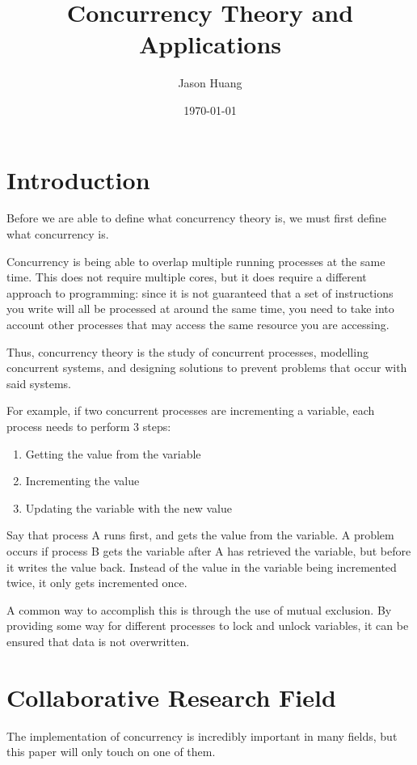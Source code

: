 \documentclass[jou]{apa7}
\title{Concurrency Theory and Applications}
\author{Jason Huang}
\date{\today}
\begin{document}
\maketitle

\section{Introduction}
Before we are able to define what concurrency theory is,
we must first define what concurrency is.

Concurrency is being able to overlap multiple running processes at the same time.
This does not require multiple cores,
but it does require a different approach to programming:
since it is not guaranteed that a set of instructions you write will all be processed at around the same time,
you need to take into account other processes that may access the same resource you are accessing.

Thus, concurrency theory is the study of concurrent processes,
modelling concurrent systems,
and designing solutions to prevent problems that occur with said systems.

For example, if two concurrent processes are incrementing a variable,
each process needs to perform 3 steps:

\begin{enumerate}
  \item Getting the value from the variable
  \item Incrementing the value
  \item Updating the variable with the new value
\end{enumerate}

Say that process A runs first, and gets the value from the variable.
A problem occurs if process B gets the variable after A has retrieved the variable, but before it writes the value back.
Instead of the value in the variable being incremented twice, it only gets incremented once.

A common way to accomplish this is through the use of mutual exclusion.
By providing some way for different processes to lock and unlock variables,
it can be ensured that data is not overwritten.
\autocite{lamportTuringLectureComputer2015}

\section{Collaborative Research Field}
The implementation of concurrency is incredibly important in many fields,
but this paper will only touch on one of them.
\end{document}
